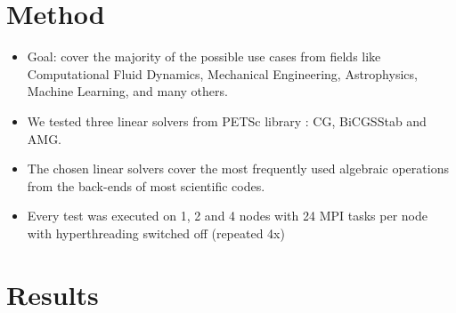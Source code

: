 \documentclass[hyperref={pdfpagelabels=false},aspectratio=169]{beamer}
\begin{document}
    \section{Method}
    \begin{frame}
    \begin{itemize}
      \item Goal: cover the majority of the possible use cases from fields like Computational Fluid Dynamics, Mechanical Engineering, Astrophysics, Machine Learning, and many others.
      \item We tested three linear solvers from PETSc library : CG, BiCGSStab and AMG.
      \item The chosen linear solvers cover the most frequently used algebraic operations from the back-ends of most scientific codes.
      \item Every test was executed on 1, 2 and 4 nodes with 24 MPI tasks per node with hyperthreading switched off (repeated 4x)
    \end{itemize}
    \end{frame}
    
    \section{Results}
\end{document}
